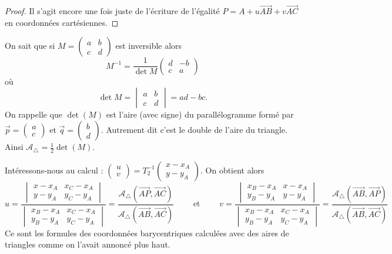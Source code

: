 \documentclass[11pt,class=report,crop=false]{standalone}
\begin{document}
\begin{proof}
Il s'agit encore une fois juste de l'écriture de l'égalité $P = A +  u \vec{AB} + v \vec{AC}$ en coordonnées cartésiennes.
\end{proof}

On sait que si $M = \begin{pmatrix} a & b \\ c & d \end{pmatrix}$ est inversible alors 
$$M^{-1} = \frac1{\det M} \begin{pmatrix} d & -b \\ c & a \end{pmatrix}$$
où 
$$\det M = \begin{vmatrix} a & b \\ c & d \end{vmatrix} = ad-bc.$$
On rappelle que $\det(M)$ est l'aire (avec signe) du parallélogramme formé par $\vec p = \begin{pmatrix} a \\ c \end{pmatrix}$ et $\vec q = \begin{pmatrix} b \\ d \end{pmatrix}$. Autrement dit c'est le double de l'aire du triangle. Ainsi $\mathcal{A}_{\triangle} = \frac12 \det(M)$.
 
 
Intéressons-nous au calcul :
$\begin{pmatrix} u \\ v \end{pmatrix} = T_2^{-1}  \begin{pmatrix} x -x_A \\ y-y_A \end{pmatrix}$.
On obtient alors 
$$u 
= \frac{\begin{vmatrix}x-x_A & x_C-x_A \\ y-y_A & y_C-y_A\end{vmatrix}}
       {\begin{vmatrix}x_B-x_A & x_C-x_A \\ y_B-y_A & y_C-y_A\end{vmatrix}} 
= \frac{\mathcal{A}_{\triangle}(\vec{AP},\vec{AC})}
        {\mathcal{A}_{\triangle}(\vec{AB},\vec{AC})} 
\qquad \text{ et } \qquad 
v 
= \frac{\begin{vmatrix}x_B-x_A & x-x_A \\ y_B-y_A & y-y_A\end{vmatrix}}
{\begin{vmatrix}x_B-x_A & x_C-x_A \\ y_B-y_A & y_C-y_A\end{vmatrix}} 
= \frac{\mathcal{A}_{\triangle}(\vec{AB},\vec{AP})}
{\mathcal{A}_{\triangle}(\vec{AB},\vec{AC})} 
$$
Ce sont les formules des coordonnées barycentriques calculées avec des aires de triangles comme on l'avait annoncé plus haut.
		
\end{document}
